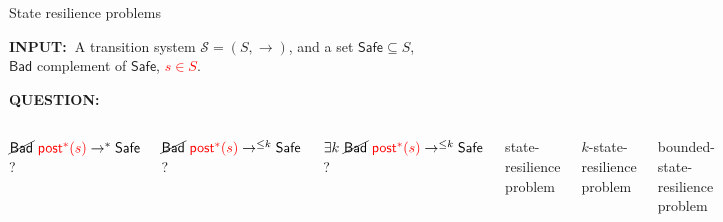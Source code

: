 \documentclass{beamer}
\newcommand{\post}{\textsf{post}}
\newcommand{\Bad}{\textsf{Bad}}
\newcommand{\Safe}{\textsf{Safe}}
\begin{document}
  \begin{frame}{{State} resilience problems}
  



  

\hspace{-0.5cm}  {\bf INPUT:\ }{A transition system $\mathscr{S}=(S,\rightarrow)$, and a set $\Safe \subseteq S$, \\ $\Bad$ complement of $\Safe$, \textcolor{red}{$s \in S$}.}

\hspace{-0.5cm}  {\bf QUESTION:\ } 

\begin{columns}[T]

  $\cancel{\Bad}~\textcolor{red}{\post^*(s) } \rightarrow^{*} \Safe$  ?

\vspace{0.15cm}

   $\cancel{\Bad}~\textcolor{red}{\post^*(s) } \rightarrow^{\leq k} \Safe$  ?

\vspace{0.15cm}

  $\exists k ~ \cancel{\Bad}~\textcolor{red}{\post^*(s) } \rightarrow^{\leq k} \Safe$   ?\newline

 
\hspace{0.6cm} {\sc  \phantom{bounded} state-resilience problem}

\vspace{0.19cm}

\hspace{0.6cm} {\sc \phantom{boundi} $k$-state-resilience problem}

\vspace{0.20cm}

\hspace{0.6cm} {\sc bounded-state-resilience problem}

\end{columns}




 




  \end{frame}
\end{document}
